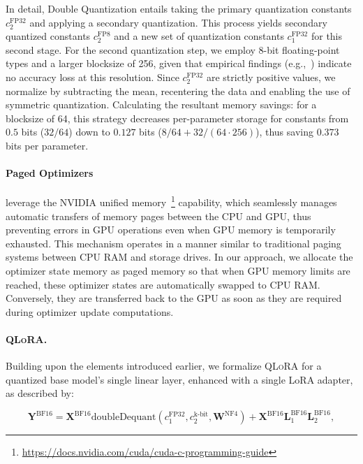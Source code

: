 In detail, Double Quantization entails taking the primary quantization constants $c_2^{\text{FP32}}$ and applying a secondary quantization. This process yields secondary quantized constants $c_2^{\text{FP8}}$ and a new set of quantization constants $c_1^{\text{FP32}}$ for this second stage. For the second quantization step, we employ 8-bit floating-point types and a larger blocksize of 256, given that empirical findings (e.g.,~\citep{dettmers2022case}) indicate no accuracy loss at this resolution. Since $c_2^{\text{FP32}}$ are strictly positive values, we normalize by subtracting the mean, recentering the data and enabling the use of symmetric quantization. Calculating the resultant memory savings: for a blocksize of 64, this strategy decreases per-parameter storage for constants from $0.5$ bits ($32/64$) down to $0.127$ bits ($8/64 + 32/(64 \cdot 256)$), thus saving $0.373$ bits per parameter.

\paragraph{Paged Optimizers} leverage the NVIDIA unified memory~\footnote{\tiny \url{https://docs.nvidia.com/cuda/cuda-c-programming-guide}} capability, which seamlessly manages automatic transfers of memory pages between the CPU and GPU, thus preventing errors in GPU operations even when GPU memory is temporarily exhausted. This mechanism operates in a manner similar to traditional paging systems between CPU RAM and storage drives. In our approach, we allocate the optimizer state memory as paged memory so that when GPU memory limits are reached, these optimizer states are automatically swapped to CPU RAM. Conversely, they are transferred back to the GPU as soon as they are required during optimizer update computations.

\paragraph{\textsc{QLoRA}.} Building upon the elements introduced earlier, we formalize \textsc{QLoRA} for a quantized base model’s single linear layer, enhanced with a single LoRA adapter, as described by:

\begin{equation}
    \mathbf{Y}^{\text{BF16}} =  \mathbf{X}^{\text{BF16}} \text{doubleDequant}(c_1^{\text{FP32}}, c_2^{\text{k-bit}}, \mathbf{W}^{\text{NF4}}) + \mathbf{X}^{\text{BF16}}\mathbf{L}^{\text{BF16}}_1\mathbf{L}^{\text{BF16}}_2,
\end{equation}

